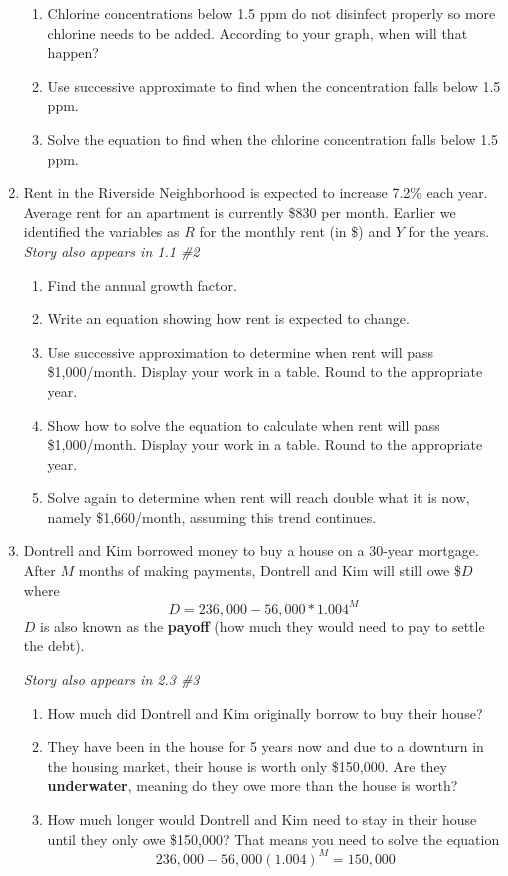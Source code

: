 \begin{enumerate}
\begin{enumerate}
\item Chlorine concentrations below 1.5 ppm do not disinfect properly so more chlorine needs to be added.  According to your graph, when will that happen? \vfill
\item Use successive approximate to find when the concentration falls below 1.5 ppm.  \vfill
\item Solve the equation to find when the chlorine concentration falls below 1.5 ppm.  \vfill
\end{enumerate} 

\newpage %

\item Rent in the Riverside Neighborhood is expected to increase 7.2\% each year.  Average rent for an apartment is currently \$830 per month.  Earlier we identified the variables as $R$ for the monthly rent  (in \$) and $Y$ for the years.
\hfill \emph{Story also appears in 1.1 \#2} 
\begin{enumerate}
\item Find the annual growth factor. \vfill
\item Write an equation showing how rent is expected to change. \vfill
\item Use successive approximation to determine when rent will pass \$1,000/month.  Display your work in a table.  Round to the appropriate year. \vfill \vfill
\item Show how to solve the equation to calculate when rent will pass \$1,000/month.  Display your work in a table.  Round to the appropriate year. \vfill \vfill
\item Solve again to determine when rent will reach double what it is now, namely  \$1,660/month, assuming this trend continues. \vfill \vfill
\end{enumerate} 

\newpage %

\item Dontrell and Kim borrowed money to buy a house on a 30-year mortgage.  After $M$ months of making payments, Dontrell and Kim will still owe \$$D$ where $$D=236,000-56,000 \ast 1.004^M$$  
$D$ is also known as the \textbf{payoff} (how much they would need to pay to settle the debt).

 \hfill \emph{Story also appears in 2.3 \#3}
 \begin{enumerate}
\item How much did Dontrell and Kim originally borrow to buy their house?   \vfill
\item They have been in the house for 5 years now and due to a downturn in the housing market, their house is worth only \$150,000.   Are they \textbf{underwater}, meaning do they owe more than the house is worth? \vfill
\item How much longer would Dontrell and Kim need to stay in their house until they only owe \$150,000?  That means you need to solve the equation $$236,000-56,000(1.004)^M=150,000$$
 \vfill \vfill
\end{enumerate}


\end{enumerate}
